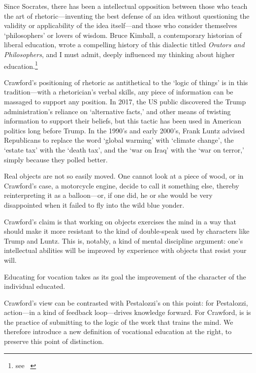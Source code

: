 Since Socrates, there has been a intellectual opposition between those who teach the art of rhetoric---inventing the best defense of an idea without questioning the validity or applicability of the idea itself---and those who consider themselves `philosophers' or lovers of wisdom. Bruce Kimball, a contemporary historian of liberal education, wrote a compelling history of this dialectic titled \emph{Orators and Philosophers}, and I must admit, deeply influenced my thinking about higher education.\footnote{see ~\citep{Kimball:1986uw}}

Crawford's positioning of rhetoric as antithetical to the `logic of things' is in this tradition---with a rhetorician's verbal skills, any piece of information can be massaged to support any position. In 2017, the US public discovered the Trump administration's reliance on `alternative facts,' and other means of twisting information to support their beliefs, but this tactic has been used in American politics long before Trump. In the 1990's and early 2000's, Frank Luntz advised Republicans to replace the word `global warming' with `climate change', the `estate tax' with the `death tax', and the `war on Iraq' with the `war on terror,' simply because they polled better. 

Real objects are not so easily moved. One cannot look at a piece of wood, or in Crawford's case, a motorcycle engine, decide to call it something else, thereby reinterpreting it as a balloon---or, if one did, he or she would be very disappointed when it failed to fly into the wild blue yonder. 

Crawford's claim is that working on objects exercises the mind in a way that should make it more resistant to the kind of double-speak used by characters like Trump and Luntz. This is, notably, a kind of mental discipline argument: one's intellectual abilities will be improved by experience with objects that resist your will.
\begin{purpose}\label{def:forvocation-crawford}
Educating for vocation takes as its goal the improvement of the character of the individual educated.
\end{purpose} 

Crawford's view can be contrasted with Pestalozzi's on this point: for Pestalozzi, action---in a kind of feedback loop---drives knowledge forward. For Crawford, is is the practice of submitting to the logic of the work that trains the mind. We therefore introduce a new definition of vocational education at the right, to preserve this point of distinction.

